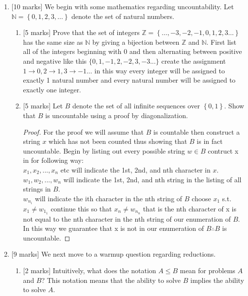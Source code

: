 \documentclass{article}
\newcommand{\set}[1]{{\left\{#1\right\}}}    %
\newcommand{\ints}{{\mathbb Z}}
\newcommand{\nats}{{\mathbb N}}
\begin{document}
\begin{enumerate}
    \item {[10 marks]} We begin with some mathematics regarding uncountability. Let $\nats=\set{0, 1,2,3,\ldots}$ denote the set of natural numbers.
    \begin{enumerate}
        \item {[5 marks]}  Prove that the set of integers $\ints=\set{\ldots,-3,-2,-1,0,1,2,3\ldots}$ has the same size as $\nats$ by giving a bijection between $\ints$ and $\nats$.
        First list all of the integers beginning with 0 and then alternating between positive and negative like this $\{0, 1, -1, 2, -2, 3, -3...\}$ create the assignment $1 \rightarrow 0, 2 \rightarrow 1, 3 \rightarrow -1...$ in this way every integer will be assigned to exactly 1 natural number and every natural number will be assigned to exactly one integer.
        \item {[5 marks]}  Let $B$ denote the set of all infinite sequences over $\set{0,1}$. Show that $B$ is uncountable using a proof by diagonalization.
        \begin{proof}
        	For the proof we will assume that $B$ is countable then construct a string $x$ which has not been counted thus showing that $B$ is in fact uncountable. 
        	Begin by listing out every possible string $w \in B$ contruct x in for following way: \\
        	$x_1, x_2,...,x_n $ etc will indicate the 1st, 2nd, and nth character in $x$. \\
        	$w_1, w_2,...,w_n $ will indicate the 1st, 2nd, and nth string in the listing of all strings in $B$.\\
        	$w_{n_i}$ will indicate the ith character in the nth string of $B$
        	choose $x_1$ s.t. $x_1 \neq w_{1_1}$ continue this so that $x_n \neq w_{n_n}$ that is the nth character of x is not equal to the nth character in the nth string of our enumeration of $B$. In this way we guarantee that x is not in our enumeration of $B \therefore B$ is uncountable.
        \end{proof}
    \end{enumerate}
    \item {[9 marks]} We next move to a warmup question regarding reductions.
        \begin{enumerate}
            \item {[2 marks]} Intuitively, what does the notation $A\leq B$ mean for problems $A$ and $B$?
            This notation means that the ability to solve $B$ implies the ability to solve $A$.

\end{enumerate}
\end{enumerate}
\end{document}
